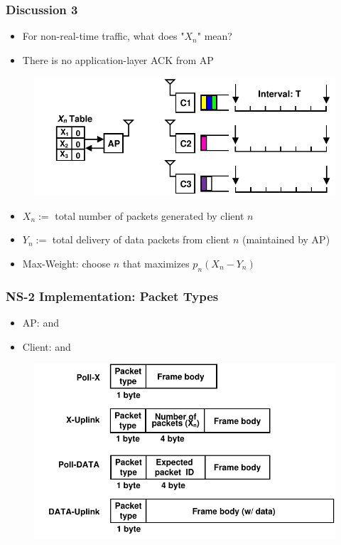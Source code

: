 \documentclass{beamer}
\begin{document}
\begin{frame}
\frametitle{Discussion 3}
\begin{itemize}
\item For non-real-time traffic, what does "$X_n$" mean? 
\item There is no application-layer ACK from AP
\end{itemize}
\begin{figure}
\centering
\includegraphics[scale=0.65]{discussion_3.pdf}
\end{figure}
\pause
\begin{itemize}
\item $X_n:=$ total number of packets generated by client $n$
\item $Y_n:=$ total delivery of data packets from client $n$ (maintained by AP)
\item Max-Weight: choose $n$ that maximizes $p_n(X_n-Y_n)$
\end{itemize}
\end{frame}

\begin{frame}
\frametitle{NS-2 Implementation: Packet Types}
\begin{itemize}
\item AP: {\color{red}{Poll-X}} and {\color{red}{Poll-DATA}}
\item Client: {\color{red}{X-Uplink}} and {\color{red}{DATA-Uplink}}
\end{itemize}
\begin{figure}
\centering
\includegraphics[scale=0.7]{header.pdf}
\end{figure}
\end{frame}
\end{document}
